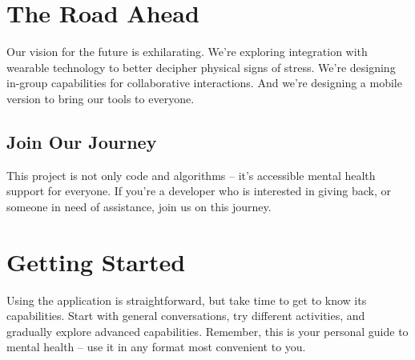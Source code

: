 \documentclass[12pt]{article}
\begin{document}
\section{The Road Ahead}
Our vision for the future is exhilarating. We're exploring integration with wearable technology to better decipher physical signs of stress. We're designing in-group capabilities for collaborative interactions. And we're designing a mobile version to bring our tools to everyone.

\subsection{Join Our Journey}
This project is not only code and algorithms – it's accessible mental health support for everyone. If you're a developer who is interested in giving back, or someone in need of assistance, join us on this journey.

\section{Getting Started}
Using the application is straightforward, but take time to get to know its capabilities. Start with general conversations, try different activities, and gradually explore advanced capabilities. Remember, this is your personal guide to mental health – use it in any format most convenient to you.
\end{document}
